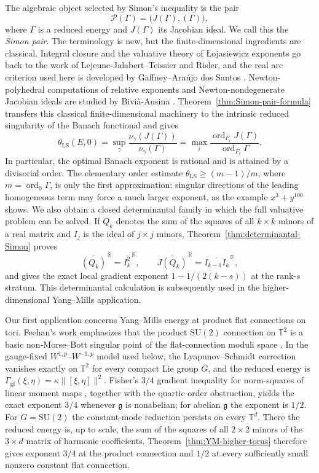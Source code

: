 \documentclass[11pt]{article}
\theoremstyle{definition}
\theoremstyle{remark}
\begin{document}
The algebraic object selected by Simon's inequality is the pair
$$
\mathcal P(\Gamma)=\bigl(J(\Gamma),(\Gamma)\bigr),
$$
where $\Gamma$ is a reduced energy and $J(\Gamma)$ its Jacobian ideal. We call this the \emph{Simon pair}. The terminology is new, but the finite-dimensional ingredients are classical. Integral closure and the valuative theory of \L{}ojasiewicz exponents go back to the work of Lejeune-Jalabert--Teissier and Risler, and the real arc criterion used here is developed by Gaffney--Ara\'ujo dos Santos \cite{LejeuneTeissier2008,GaffneyAraujo2010}. Newton-polyhedral computations of relative exponents and Newton-nondegenerate Jacobian ideals are studied by Bivi\`a-Ausina \cite{Bivia2003,Bivia2005}. Theorem~\ref{thm:Simon-pair-formula} transfers this classical finite-dimensional machinery to the intrinsic reduced singularity of the Banach functional and gives
$$
\theta_{\mathrm{LS}}(E,0)
=\sup_\gamma\frac{\nu_\gamma(J(\Gamma))}{\nu_\gamma(\Gamma)}
=\max_i\frac{\operatorname{ord}_{F_i}J(\Gamma)}{\operatorname{ord}_{F_i}\Gamma}.
$$
In particular, the optimal Banach exponent is rational and is attained by a divisorial order. The elementary order estimate $\theta_{\mathrm{LS}}\ge(m-1)/m$, where $m=\operatorname{ord}_0\Gamma$, is only the first approximation: singular directions of the leading homogeneous term may force a much larger exponent, as the example $x^3+y^{100}$ shows. We also obtain a closed determinantal family in which the full valuative problem can be solved. If $Q_k$ denotes the sum of the squares of all $k\times k$ minors of a real matrix and $I_j$ is the ideal of $j\times j$ minors, Theorem~\ref{thm:determinantal-Simon} proves
$$
\overline{(Q_k)}^{\,\mathbb R}=\overline{I_k^2}^{\,\mathbb R},
\qquad
\overline{J(Q_k)}^{\,\mathbb R}=\overline{I_{k-1}I_k}^{\,\mathbb R},
$$
and gives the exact local gradient exponent $1-1/(2(k-s))$ at the rank-$s$ stratum. This determinantal calculation is subsequently used in the higher-dimensional Yang--Mills application.

Our first application concerns Yang--Mills energy at product flat connections on tori. Feehan's work emphasizes that the product $\mathrm{SU}(2)$ connection on $\mathbb T^2$ is a basic non-Morse--Bott singular point of the flat-connection moduli space \cite{FeehanFlat2019}. In the gauge-fixed $W^{1,p}$--$W^{-1,p}$ model used below, the Lyapunov--Schmidt correction vanishes exactly on $\mathbb T^2$ for every compact Lie group $G$, and the reduced energy is $\Gamma_{\mathrm{gf}}(\xi,\eta)=\kappa\|[\xi,\eta]\|^2$. Fisher's $3/4$ gradient inequality for norm-squares of linear moment maps \cite[Theorem~4.7]{Fisher2014}, together with the quartic order obstruction, yields the exact exponent $3/4$ whenever $\mathfrak g$ is nonabelian; for abelian $\mathfrak g$ the exponent is $1/2$. For $G=\mathrm{SU}(2)$ the constant-mode reduction persists on every $\mathbb T^d$. There the reduced energy is, up to scale, the sum of the squares of all $2\times2$ minors of the $3\times d$ matrix of harmonic coefficients. Theorem~\ref{thm:YM-higher-torus} therefore gives exponent $3/4$ at the product connection and $1/2$ at every sufficiently small nonzero constant flat connection.
\end{document}
